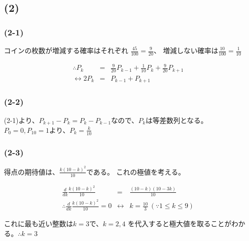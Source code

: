 \documentclass[]{jsarticle}
\begin{document}
    \subsection*{(2)}
        \subsubsection*{(2-1)}
            コインの枚数が増減する確率はそれぞれ
            $\displaystyle\frac{45}{100} = \frac{9}{20}$、
            増減しない確率は$\displaystyle\frac{10}{100} = \frac{1}{10}$
            
            \begin{eqnarray}
                \therefore P_k &=& \frac{9}{20}P_{k - 1} + \frac{1}{10}P_k + \frac{9}{20}P_{k + 1} \nonumber \\
                \leftrightarrow 2P_k &=& P_{k - 1} + P_{k + 1} \nonumber
            \end{eqnarray}
        \subsubsection*{(2-2)}
            (2-1)より、$P_{k + 1} - P_k = P_k - P_{k - 1}$なので、$P_k$は等差数列となる。
            $P_0 = 0, P_{10} = 1$より、$\displaystyle P_k = \frac{k}{10}$
        \subsubsection*{(2-3)}
            得点の期待値は、$\displaystyle\frac{k(10 - k)^2}{10}$である。
            これの極値を考える。

            \begin{eqnarray}
                \frac{d}{dk}\frac{k(10 - k)^2}{10} &=& \frac{(10 - k)(10 - 3k)}{10} \nonumber \\
                \therefore \frac{d}{dk}\frac{k(10 - k)^2}{10} = 0 &\leftrightarrow& k = \frac{10}{3} \ (\because 1 \leq k \leq 9) \nonumber
            \end{eqnarray}

            これに最も近い整数は$k = 3$で、$k = 2, 4$
            を代入すると極大値を取ることがわかる。$\therefore k = 3$
\end{document}
